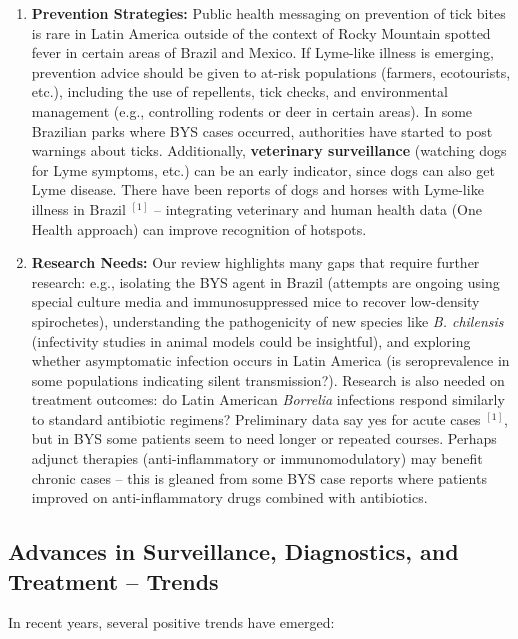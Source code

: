 \documentclass[11pt,letterpaper]{article}
\newcommand{\mycite}[1]{$^{[#1]}$}
\begin{document}
\begin{enumerate}
    \item \textbf{Prevention Strategies:} Public health messaging on prevention of tick bites is rare in Latin America outside of the context of Rocky Mountain spotted fever in certain areas of Brazil and Mexico. If Lyme-like illness is emerging, prevention advice should be given to at-risk populations (farmers, ecotourists, etc.), including the use of repellents, tick checks, and environmental management (e.g., controlling rodents or deer in certain areas). In some Brazilian parks where BYS cases occurred, authorities have started to post warnings about ticks. Additionally, \textbf{veterinary surveillance} (watching dogs for Lyme symptoms, etc.) can be an early indicator, since dogs can also get Lyme disease. There have been reports of dogs and horses with Lyme-like illness in Brazil \mycite{1} – integrating veterinary and human health data (One Health approach) can improve recognition of hotspots.

    \item \textbf{Research Needs:} Our review highlights many gaps that require further research: e.g., isolating the BYS agent in Brazil (attempts are ongoing using special culture media and immunosuppressed mice to recover low-density spirochetes), understanding the pathogenicity of new species like \textit{B. chilensis} (infectivity studies in animal models could be insightful), and exploring whether asymptomatic infection occurs in Latin America (is seroprevalence in some populations indicating silent transmission?). Research is also needed on treatment outcomes: do Latin American \textit{Borrelia} infections respond similarly to standard antibiotic regimens? Preliminary data say yes for acute cases \mycite{1}, but in BYS some patients seem to need longer or repeated courses. Perhaps adjunct therapies (anti-inflammatory or immunomodulatory) may benefit chronic cases – this is gleaned from some BYS case reports where patients improved on anti-inflammatory drugs combined with antibiotics.
\end{enumerate}

\subsection{Advances in Surveillance, Diagnostics, and Treatment – Trends}
In recent years, several positive trends have emerged:
\end{document}
